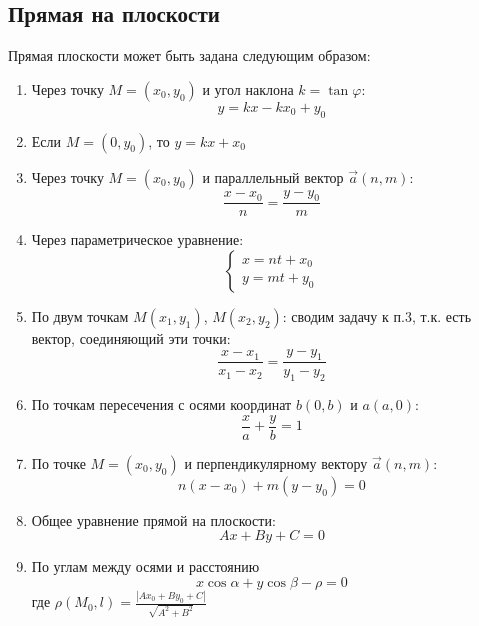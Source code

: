 \subsection{Прямая на плоскости}
Прямая плоскости может быть задана следующим образом:
\begin{enumerate}
    \item  Через точку $M=(x_0,y_0)$ и угол наклона $k=\tan\varphi$:
    $$y=kx-kx_0+y_0$$
    \item Если $M=(0,y_0)$, то $y=kx+x_0$
\item Через точку $M=(x_0,y_0)$ и параллельный вектор $\Vec{a}(n,m)$:
 $$\frac{x-x_0}{n}=\frac{y-y_0}{m}$$
\item Через параметрическое уравнение: 
$$\begin{cases}x=nt+x_0\\y=mt+y_0 \end{cases}$$
\item По двум точкам $M(x_1,y_1)$, $M(x_2,y_2)$: сводим задачу к п.3, т.к.
		есть вектор, соединяющий эти точки:
$$\frac{x-x_1}{x_1-x_2}=\frac{y-y_1}{y_1-y_2}$$
\item По точкам пересечения с осями координат $b(0,b)$ и $a(a,0)$: 
$$\frac{x}{a}+\frac{y}{b}=1$$
\item По точке $M=(x_0,y_0)$ и перпендикулярному вектору $\Vec{a}(n,m)$:
$$n(x-x_0)+m(y-y_0)=0$$
\item Общее уравнение прямой на плоскости:
$$Ax+By+C=0$$
\item По углам между осями и расстоянию 
$$x\cos\alpha+y\cos\beta-\rho=0$$
где $\rho(M_0,l)=\frac{|Ax_0+By_0+C|}{\sqrt{A^2+B^2}}$
 
\end{enumerate}


